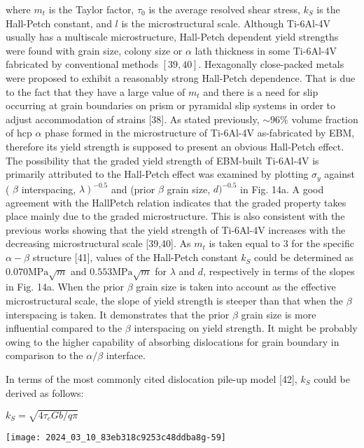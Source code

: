 \documentclass[10pt]{article}
\begin{document}
where $m_{t}$ is the Taylor factor, $\tau_{0}$ is the average resolved shear stress, $k_{S}$ is the Hall-Petch constant, and $l$ is the microstructural scale. Although Ti-6Al-4V usually has a multiscale microstructure, Hall-Petch dependent yield strengths were found with grain size, colony size or $\alpha$ lath thickness in some Ti-6Al-4V fabricated by conventional methods $[39,40]$. Hexagonally close-packed metals were proposed to exhibit a reasonably strong Hall-Petch dependence. That is due to the fact that they have a large value of $m_{t}$ and there is a need for slip occurring at grain boundaries on prism or pyramidal slip systems in order to adjust accommodation of strains [38]. As stated previously, $\sim 96 \%$ volume fraction of hcp $\alpha$ phase formed in the microstructure of Ti-6Al-4V as-fabricated by EBM, therefore its yield strength is supposed to present an obvious Hall-Petch effect. The possibility that the graded yield strength of EBM-built Ti-6Al-4V is primarily attributed to the Hall-Petch effect was examined by plotting $\sigma_{y}$ against ( $\beta$ interspacing, $\left.\lambda\right)^{-0.5}$ and (prior $\beta$ grain size, $d)^{-0.5}$ in Fig. 14a. A good agreement with the HallPetch relation indicates that the graded property takes place mainly due to the graded microstructure. This is also consistent with the previous works showing that the yield strength of Ti-6Al-4V increases with the decreasing microstructural scale [39,40]. As $m_{t}$ is taken equal to 3 for the specific $\alpha-\beta$ structure [41], values of the Hall-Petch constant $k_{S}$ could be determined as $0.070 \mathrm{MPa} \sqrt{m}$ and $0.553 \mathrm{MPa} \sqrt{m}$ for $\lambda$ and $d$, respectively in terms of the slopes in Fig. 14a. When the prior $\beta$ grain size is taken into account as the effective microstructural scale, the slope of yield strength is steeper than that when the $\beta$ interspacing is taken. It demonstrates that the prior $\beta$ grain size is more influential compared to the $\beta$ interspacing on yield strength. It might be probably owing to the higher capability of absorbing dislocations for grain boundary in comparison to the $\alpha / \beta$ interface.

In terms of the most commonly cited dislocation pile-up model [42], $k_{S}$ could be derived as follows:

$k_{S}=\sqrt{4 \tau_{c} G b / q \pi}$

\begin{center}
\texttt{[image: 2024\_03\_10\_83eb318c9253c48ddba8g-59]}
\end{center}
\end{document}
